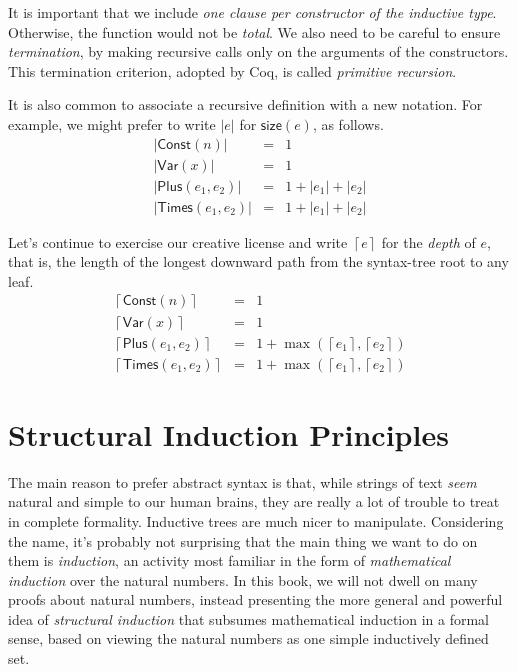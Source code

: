 \documentclass{amsbook}
\theoremstyle{definition}
\theoremstyle{remark}
\numberwithin{section}{chapter}
\numberwithin{equation}{chapter}
\begin{document}
It is important that we include \emph{one clause per constructor of the inductive type}.
Otherwise, the function would not be \emph{total}.
We also need to be careful to ensure \emph{termination}, by making recursive calls only on the arguments of the constructors.
This termination criterion, adopted by Coq, is called \emph{primitive recursion}.

\newcommand{\size}[1]{{\left \lvert #1 \right \rvert}}

It is also common to associate a recursive definition with a new notation.
For example, we might prefer to write $\size{e}$ for $\mathsf{size}(e)$, as follows.
\begin{eqnarray*}
  \size{\mathsf{Const}(n)} &=& 1 \\
  \size{\mathsf{Var}(x)} &=& 1 \\
  \size{\mathsf{Plus}(e_1, e_2)} &=& 1 + \size{e_1} + \size{e_2} \\
  \size{\mathsf{Times}(e_1, e_2)} &=& 1 + \size{e_1} + \size{e_2}
\end{eqnarray*}

\newcommand{\depth}[1]{{\left \lceil #1 \right \rceil}}

Let's continue to exercise our creative license and write $\depth{e}$ for the \emph{depth} of $e$, that is, the length of the longest downward path from the syntax-tree root to any leaf.
\begin{eqnarray*}
  \depth{\mathsf{Const}(n)} &=& 1 \\
  \depth{\mathsf{Var}(x)} &=& 1 \\
  \depth{\mathsf{Plus}(e_1, e_2)} &=& 1 + \max(\depth{e_1}, \depth{e_2}) \\
  \depth{\mathsf{Times}(e_1, e_2)} &=& 1 + \max(\depth{e_1}, \depth{e_2})
\end{eqnarray*}


\section{Structural Induction Principles}

The main reason to prefer abstract syntax is that, while strings of text \emph{seem} natural and simple to our human brains, they are really a lot of trouble to treat in complete formality.
Inductive trees are much nicer to manipulate.
Considering the name, it's probably not surprising that the main thing we want to do on them is \emph{induction}, an activity most familiar in the form of \emph{mathematical induction} over the natural numbers.
In this book, we will not dwell on many proofs about natural numbers, instead presenting the more general and powerful idea of \emph{structural induction} that subsumes mathematical induction in a formal sense, based on viewing the natural numbers as one simple inductively defined set.
\end{document}
